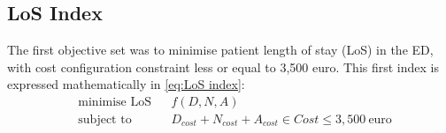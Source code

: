 \documentclass[11pt]{article} %
\begin{document}

\subsection{LoS Index}

The first objective set was to minimise patient length of stay (LoS)
in the ED, with cost configuration constraint less or equal to 3,500
euro. This first index is expressed mathematically in \ref{eq:LoS index}:
\begin{equation}
\begin{aligned} & {\text{minimise LoS}} &  & f(D,N,A)\\
 & \text{subject to} &  & D_{cost}+N_{cost}+A_{cost}\in Cost\leq3,500\:\text{euro}
\end{aligned}
\label{eq:LoS index}
\end{equation}
\end{document}
